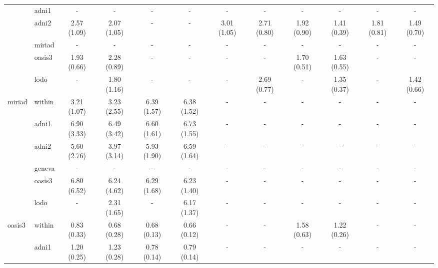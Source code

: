 \begin{table*}
{\begin{tabular}{llcccccccccc}
       & adni1 &            - &            - &            - &            - &            - &            - &            - &            - &            - &            - \\
       & adni2 &  2.57 (1.09) &  2.07 (1.05) &            - &            - &  3.01 (1.05) &  2.71 (0.80) &  1.92 (0.90) &  1.41 (0.39) &  1.81 (0.81) &  1.49 (0.70) \\
       & miriad &            - &            - &            - &            - &            - &            - &            - &            - &            - &            - \\
       & oasis3 &  1.93 (0.66) &  2.28 (0.89) &            - &            - &            - &            - &  1.70 (0.51) &  1.63 (0.55) &            - &            - \\
\cmidrule(lr){2-12}
       & lodo &            - &  1.80 (1.16) &            - &            - &            - &  2.69 (0.77) &            - &  1.35 (0.37) &            - &  1.42 (0.66) \\
\midrule
miriad & within &  3.21 (1.07) &  3.23 (2.55) &  6.39 (1.57) &  6.38 (1.52) &            - &            - &            - &            - &            - &            - \\
\cmidrule(lr){2-12}
       & adni1 &  6.90 (3.33) &  6.49 (3.42) &  6.60 (1.61) &  6.73 (1.55) &            - &            - &            - &            - &            - &            - \\
       & adni2 &  5.60 (2.76) &  3.97 (3.14) &  5.93 (1.90) &  6.59 (1.64) &            - &            - &            - &            - &            - &            - \\
       & geneva &            - &            - &            - &            - &            - &            - &            - &            - &            - &            - \\
       & oasis3 &  6.80 (6.52) &  6.24 (4.62) &  6.29 (1.68) &  6.23 (1.40) &            - &            - &            - &            - &            - &            - \\
\cmidrule(lr){2-12}
       & lodo &            - &  2.31 (1.65) &            - &  6.17 (1.37) &            - &            - &            - &            - &            - &            - \\
\midrule
oasis3 & within &  0.83 (0.33) &  0.68 (0.28) &  0.68 (0.13) &  0.66 (0.12) &            - &            - &  1.58 (0.63) &  1.22 (0.26) &            - &            - \\
\cmidrule(lr){2-12}
       & adni1 &  1.20 (0.25) &  1.23 (0.28) &  0.78 (0.14) &  0.79 (0.14) &            - &            - &            - &            - &            - &            - \\

\end{tabular}}
\end{table*}
